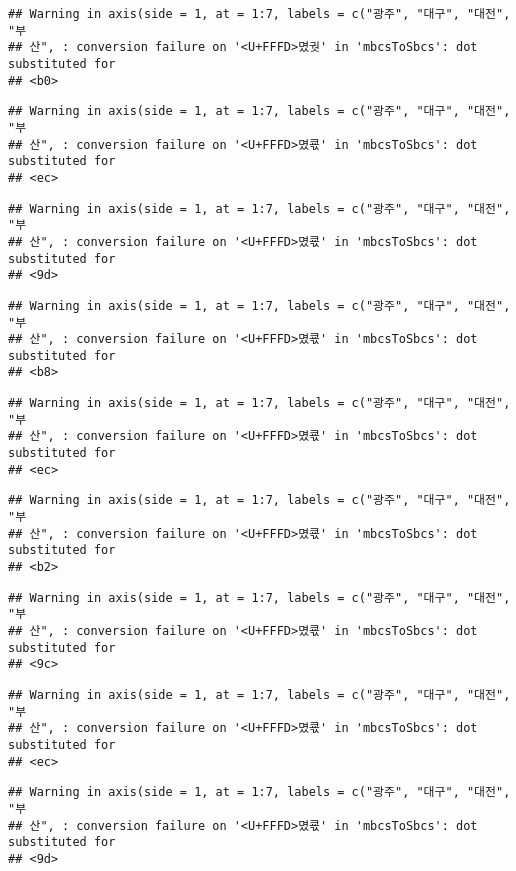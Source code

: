 \documentclass[]{article}
\begin{document}
\begin{verbatim}
## Warning in axis(side = 1, at = 1:7, labels = c("광주", "대구", "대전", "부
## 산", : conversion failure on '<U+FFFD>몄궛' in 'mbcsToSbcs': dot substituted for
## <b0>
\end{verbatim}

\begin{verbatim}
## Warning in axis(side = 1, at = 1:7, labels = c("광주", "대구", "대전", "부
## 산", : conversion failure on '<U+FFFD>몄쿇' in 'mbcsToSbcs': dot substituted for
## <ec>
\end{verbatim}

\begin{verbatim}
## Warning in axis(side = 1, at = 1:7, labels = c("광주", "대구", "대전", "부
## 산", : conversion failure on '<U+FFFD>몄쿇' in 'mbcsToSbcs': dot substituted for
## <9d>
\end{verbatim}

\begin{verbatim}
## Warning in axis(side = 1, at = 1:7, labels = c("광주", "대구", "대전", "부
## 산", : conversion failure on '<U+FFFD>몄쿇' in 'mbcsToSbcs': dot substituted for
## <b8>
\end{verbatim}

\begin{verbatim}
## Warning in axis(side = 1, at = 1:7, labels = c("광주", "대구", "대전", "부
## 산", : conversion failure on '<U+FFFD>몄쿇' in 'mbcsToSbcs': dot substituted for
## <ec>
\end{verbatim}

\begin{verbatim}
## Warning in axis(side = 1, at = 1:7, labels = c("광주", "대구", "대전", "부
## 산", : conversion failure on '<U+FFFD>몄쿇' in 'mbcsToSbcs': dot substituted for
## <b2>
\end{verbatim}

\begin{verbatim}
## Warning in axis(side = 1, at = 1:7, labels = c("광주", "대구", "대전", "부
## 산", : conversion failure on '<U+FFFD>몄쿇' in 'mbcsToSbcs': dot substituted for
## <9c>
\end{verbatim}

\begin{verbatim}
## Warning in axis(side = 1, at = 1:7, labels = c("광주", "대구", "대전", "부
## 산", : conversion failure on '<U+FFFD>몄쿇' in 'mbcsToSbcs': dot substituted for
## <ec>
\end{verbatim}

\begin{verbatim}
## Warning in axis(side = 1, at = 1:7, labels = c("광주", "대구", "대전", "부
## 산", : conversion failure on '<U+FFFD>몄쿇' in 'mbcsToSbcs': dot substituted for
## <9d>
\end{verbatim}
\end{document}
